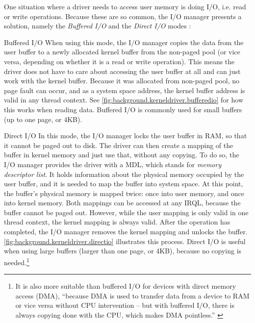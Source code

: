 One situation where a driver needs to access user memory is doing I/O, i.e. read or write operations. Because these are so common, the I/O manager presents a solution, namely the \emph{Buffered I/O} and the \emph{Direct I/O} modes \cite{Yosifovich2017}:
\begin{descitemize}
	\item[Buffered I/O] When using this mode, the I/O manager copies the data from the user buffer to a newly allocated kernel buffer from the non-paged pool (or vice versa, depending on whether it is a read or write operation). This means the driver does not have to care about accessing the user buffer at all and can just work with the kernel buffer. Because it was allocated from non-paged pool, no page fault can occur, and as a system space address, the kernel buffer address is valid in any thread context. See \autoref{fig:background.kerneldriver.bufferedio} for how this works when reading data. Buffered I/O is commonly used for small buffers (up to one page, or 4KB).
	\item[Direct I/O] In this mode, the I/O manager locks the user buffer in RAM, so that it cannot be paged out to disk. The driver can then create a mapping of the buffer in kernel memory and just use that, without any copying. To do so, the I/O manager provides the driver with a MDL, which stands for \emph{memory descriptor list}. It holds information about the physical memory occupied by the user buffer, and it is needed to map the buffer into system space. At this point, the buffer's physical memory is mapped twice: once into user memory, and once into kernel memory. Both mappings can be accessed at any IRQL, because the buffer cannot be paged out. However, while the user mapping is only valid in one thread context, the kernel mapping is always valid. After the operation has completed, the I/O manager removes the kernel mapping and unlocks the buffer. \autoref{fig:background.kerneldriver.directio} illustrates this process. Direct I/O is useful when using large buffers (larger than one page, or 4KB), because no copying is needed.\footnote{\label{fn:background.kerneldriver.dma} It is also more suitable than buffered I/O for devices with direct memory access (DMA), ``because DMA is used to transfer data from a device to RAM or vice versa without CPU intervention -- but with buffered I/O, there is always copying done with the CPU, which makes DMA pointless.'' \cite{Yosifovich2017}}
\end{descitemize}

